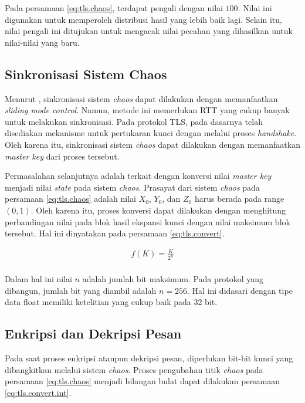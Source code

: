 Pada persamaan \ref{eq:tls.chaos}, terdapat pengali dengan nilai $100$. Nilai ini digunakan untuk memperoleh distribusi hasil yang lebih baik lagi. Selain itu, nilai pengali ini ditujukan untuk mengacak nilai pecahan yang dihasilkan untuk nilai-nilai yang baru.

\subsection{Sinkronisasi Sistem Chaos}

Menurut \textcite{lin2021}, sinkronisasi sistem \emph{chaos} dapat dilakukan dengan memanfaatkan \emph{sliding mode control}. Namun, metode ini memerlukan RTT yang cukup banyak untuk melakukan sinkronisasi. Pada protokol TLS, pada dasarnya telah disediakan mekanisme untuk pertukaran kunci dengan melalui proses \emph{handshake}. Oleh karena itu, sinkronisasi sistem \emph{chaos} dapat dilakukan dengan memanfaatkan \emph{master key} dari proses tersebut.

Permasalahan selanjutnya adalah terkait dengan konversi nilai \emph{master key} menjadi nilai \emph{state} pada sistem \emph{chaos}. Prasayat dari sistem \emph{chaos} pada persamaan \ref{eq:tls.chaos} adalah nilai $X_0$, $Y_0$, dan $Z_0$ harus berada pada range $(0,1)$. Oleh karena itu, proses konversi dapat dilakukan dengan menghitung perbandingan nilai pada blok hasil ekspansi kunci dengan nilai maksimum blok tersebut. Hal ini dinyatakan pada persamaan \ref{eq:tls.convert}.

\begin{equation}
  \begin{aligned}
    f(K) = \frac{K}{2^{n}} \\
  \end{aligned}
  \label{eq:tls.convert}
\end{equation}

Dalam hal ini nilai $n$ adalah jumlah bit maksimum. Pada protokol yang dibangun, jumlah bit yang diambil adalah $n = 256$. Hal ini didasari dengan tipe data float memiliki ketelitian yang cukup baik pada 32 bit.

\subsection{Enkripsi dan Dekripsi Pesan}

Pada saat proses enkripsi ataupun dekripsi pesan, diperlukan bit-bit kunci yang dibangkitkan melalui sistem \emph{chaos}. Proses pengubahan titik \emph{chaos} pada persamaan \ref{eq:tls.chaos} menjadi bilangan bulat dapat dilakukan persamaan \ref{eq:tls.convert.int}.

